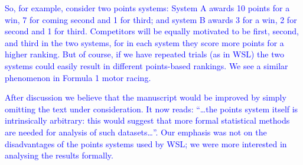 \documentclass[12pt]{article}
\begin{document}
\textcolor{blue}{
  So, for example, consider two points systems: System A awards 10
  points for a win, 7 for coming second and 1 for third; and system B
  awards 3 for a win, 2 for second and 1 for third.  Competitors will
  be equally motivated to be first, second, and third in the two
  systems, for in each system they score more points for a higher
  ranking.  But of course, if we have repeated trials (as in WSL) the
  two systems could easily result in different points-based rankings.
  We see a similar phenomenon in Formula 1 motor racing.}
 
\textcolor{blue}{ After discussion we believe that the manuscript
  would be improved by simply omitting the text under consideration.
  It now reads: ``\ldots the points system itself is intrinsically
  arbitrary: this would suggest that more formal statistical methods
  are needed for analysis of such datasets\ldots''.  Our emphasis was
  not on the disadvantages of the points systems used by WSL; we were
  more interested in analysing the results formally.
}
\end{document}
